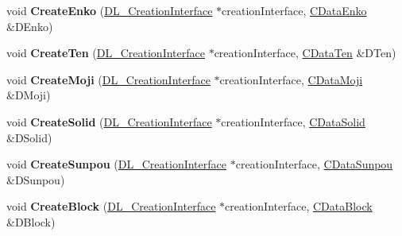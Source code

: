 \begin{DoxyCompactItemize}
\item 
\hypertarget{classDL__Jww_a088c5366e972bac76312531fe93533c5}{void {\bfseries Create\-Enko} (\hyperlink{classDL__CreationInterface}{D\-L\-\_\-\-Creation\-Interface} $\ast$creation\-Interface, \hyperlink{classCDataEnko}{C\-Data\-Enko} \&D\-Enko)}\label{classDL__Jww_a088c5366e972bac76312531fe93533c5}

\item 
\hypertarget{classDL__Jww_aecbf559077998aadf68b905ab2935eb7}{void {\bfseries Create\-Ten} (\hyperlink{classDL__CreationInterface}{D\-L\-\_\-\-Creation\-Interface} $\ast$creation\-Interface, \hyperlink{classCDataTen}{C\-Data\-Ten} \&D\-Ten)}\label{classDL__Jww_aecbf559077998aadf68b905ab2935eb7}

\item 
\hypertarget{classDL__Jww_a52dbf1428d4ca8e14986578d2e18dac6}{void {\bfseries Create\-Moji} (\hyperlink{classDL__CreationInterface}{D\-L\-\_\-\-Creation\-Interface} $\ast$creation\-Interface, \hyperlink{classCDataMoji}{C\-Data\-Moji} \&D\-Moji)}\label{classDL__Jww_a52dbf1428d4ca8e14986578d2e18dac6}

\item 
\hypertarget{classDL__Jww_a0cffd03394012be63c63034e9917faf8}{void {\bfseries Create\-Solid} (\hyperlink{classDL__CreationInterface}{D\-L\-\_\-\-Creation\-Interface} $\ast$creation\-Interface, \hyperlink{classCDataSolid}{C\-Data\-Solid} \&D\-Solid)}\label{classDL__Jww_a0cffd03394012be63c63034e9917faf8}

\item 
\hypertarget{classDL__Jww_ac1f0293371b41ebed10409ae3e44a9af}{void {\bfseries Create\-Sunpou} (\hyperlink{classDL__CreationInterface}{D\-L\-\_\-\-Creation\-Interface} $\ast$creation\-Interface, \hyperlink{classCDataSunpou}{C\-Data\-Sunpou} \&D\-Sunpou)}\label{classDL__Jww_ac1f0293371b41ebed10409ae3e44a9af}

\item 
\hypertarget{classDL__Jww_a9a23feb08ea80734a45ad56cc34ec203}{void {\bfseries Create\-Block} (\hyperlink{classDL__CreationInterface}{D\-L\-\_\-\-Creation\-Interface} $\ast$creation\-Interface, \hyperlink{classCDataBlock}{C\-Data\-Block} \&D\-Block)}\label{classDL__Jww_a9a23feb08ea80734a45ad56cc34ec203}

\end{DoxyCompactItemize}
